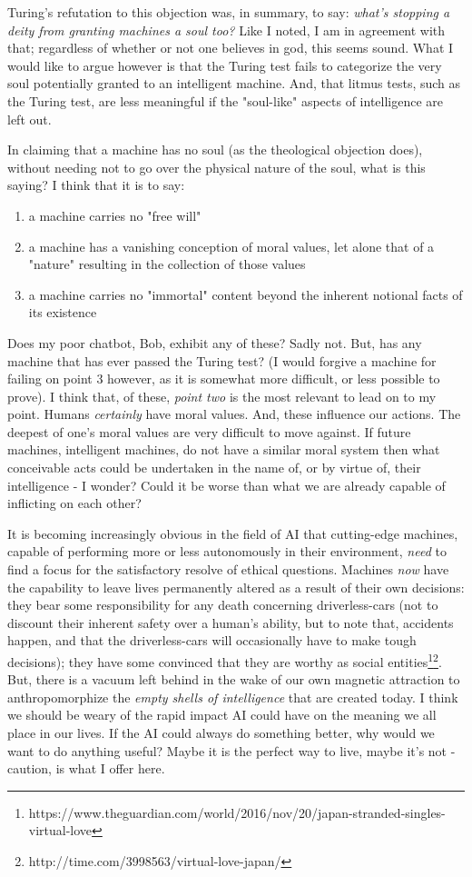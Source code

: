 \documentclass[]{article}
\begin{document}
Turing's refutation to this objection was, in summary, to say: \emph{what's stopping a deity from granting machines a soul too?} Like I noted, I am in agreement with that; regardless of whether or not one believes in god, this seems sound. What I would like to argue however is that the Turing test fails to categorize the very soul potentially granted to an intelligent machine. And, that litmus tests, such as the Turing test, are less meaningful if the "soul-like" aspects of intelligence are left out.

In claiming that a machine has no soul (as the theological objection does), without needing not to go over the physical nature of the soul, what is this saying? I think that it is to say:
\begin{enumerate}
	\item a machine carries no "free will"
	\item a machine has a vanishing conception of moral values, let alone that of a "nature" resulting in the collection of those values
	\item a machine carries no "immortal" content beyond the inherent notional facts of its existence
\end{enumerate}

\noindent
Does my poor chatbot, Bob, exhibit any of these? Sadly not. But, has any machine that has ever passed the Turing test? (I would forgive a machine for failing on point 3 however, as it is somewhat more difficult, or less possible to prove).
I think that, of these, \emph{point two} is the most relevant to lead on to my point. Humans \emph{certainly} have moral values. And, these influence our actions. The deepest of one's moral values are very difficult to move against. If future machines, intelligent machines, do not have a similar moral system then what conceivable acts could be undertaken in the name of, or by virtue of, their intelligence - I wonder? Could it be worse than what we are already capable of inflicting on each other?

It is becoming increasingly obvious in the field of AI that cutting-edge machines, capable of performing more or less autonomously in their environment, \emph{need} to find a focus for the satisfactory resolve of ethical questions. Machines \emph{now} have the capability to leave lives permanently altered as a result of their own decisions: they bear some responsibility for any death concerning driverless-cars (not to discount their inherent safety over a human's ability, but to note that, accidents happen, and that the driverless-cars will occasionally have to make tough decisions); they have some convinced that they are worthy as social entities\footnote{https://www.theguardian.com/world/2016/nov/20/japan-stranded-singles-virtual-love}\footnote{http://time.com/3998563/virtual-love-japan/}. But, there is a vacuum left behind in the wake of our own magnetic attraction to anthropomorphize the \emph{empty shells of intelligence} that are created today. I think we should be weary of the rapid impact AI could have on the meaning we all place in our lives. If the AI could always do something better, why would we want to do anything useful? Maybe it is the perfect way to live, maybe it's not - caution, is what I offer here.
\end{document}
